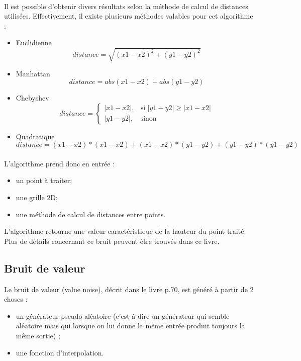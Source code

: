 \paragraph{}
Il est possible d'obtenir divers résultats selon la méthode de calcul de distances utilisées. Effectivement, il existe plusieurs méthodes valables pour cet algorithme :
\begin{itemize}
 \item Euclidienne
 \begin{equation}
  distance = \sqrt{(x1 - x2)^2 + (y1 - y2)^2}
 \end{equation}
 \item Manhattan
 \begin{equation}
  distance = abs(x1-x2) + abs(y1-y2) 
 \end{equation}
 \item Chebyshev
 \[
    distance= 
\begin{cases}
    |x1-x2|,& \text{si } |y1-y2|\geq|x1-x2|\\
    |y1-y2|,& \text{sinon}
\end{cases}
\]
 \item Quadratique
  \begin{equation}
  distance = (x1-x2)*(x1-x2) + (x1-x2)*(y1-y2) + (y1-y2)*(y1-y2)
  \end{equation}
\end{itemize}

\paragraph{}
L'algorithme prend donc en entrée :
\begin{itemize}
 \item un point à traiter;
 \item une grille 2D;
 \item une méthode de calcul de distances entre points.
\end{itemize}
L'algorithme retourne une valeur caractéristique de la hauteur du point traité.\newline
Plus de détails concernant ce bruit peuvent être trouvés dans ce livre\cite{Eber02}.


\subsection{Bruit de valeur}
Le bruit de valeur (value noise), décrit dans le livre
\cite{Eber02} p.70, est généré à partir de 2 choses :\\
\begin{itemize}
\item un générateur pseudo-aléatoire (c'est à dire un générateur qui semble
aléatoire mais qui lorsque on lui donne la même entrée produit toujours la même
sortie) ;
\item une fonction d'interpolation.\\
\end{itemize}

